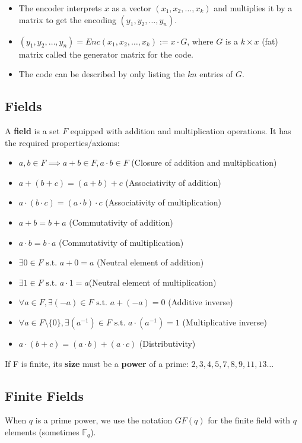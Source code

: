 \documentclass[11pt]{article}
\begin{document}
\begin{itemize}
  \item The encoder interprets $x$ as a vector $(x_1, x_2, \ldots, x_k)$ and multiplies it by a matrix to get the encoding $(y_1, y_2, \ldots, y_n)$.
  \item $(y_1, y_2, \ldots, y_n) = Enc(x_1, x_2, \ldots, x_k) := x \cdot G$, where $G$ is a $k \times x$ (fat) matrix called the generator matrix for the code.
  \item The code can be described by only listing the $kn$ entries of $G$.
\end{itemize}

\subsection{Fields}
A \textbf{field} is a set $F$ equipped with addition and multiplication operations.
It has the required properties/axioms:
\begin{itemize}
  \item $a, b \in F \implies a + b \in F, a \cdot b \in F$ (Closure of addition and multiplication)
  \item $a + (b + c) = (a + b) + c$ (Associativity of addition)
  \item $a \cdot (b \cdot c) = (a \cdot b) \cdot c$ (Associativity of multiplication)
  \item $a + b = b + a$ (Commutativity of addition)
  \item $a \cdot b = b \cdot a$ (Commutativity of multiplication)
  \item $\exists 0 \in F \text{ s.t. } a + 0 = a$ (Neutral element of addition)
  \item $\exists 1 \in F \text{ s.t. } a \cdot 1 = a$(Neutral element of multiplication)
  \item $\forall a \in F, \exists (-a) \in F \text{ s.t. } a + (-a) = 0$ (Additive inverse)
  \item $\forall a \in F \setminus \{ 0 \}, \exists (a^{-1}) \in F \text{ s.t. } a \cdot (a^{-1}) = 1$ (Multiplicative inverse)
  \item $a \cdot (b + c) = (a \cdot b) + (a \cdot c)$ (Distributivity)
\end{itemize}

If F is finite, its \textbf{size} must be a \textbf{power} of a prime: $2, 3, 4, 5, 7, 8, 9, 11, 13 \ldots$

\subsection{Finite Fields}
When $q$ is a prime power, we use the notation $GF(q)$ for the finite field with $q$ elements (sometimes $\mathbb{F}_q$).
\end{document}

